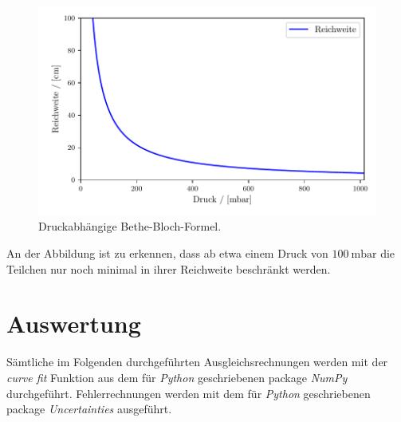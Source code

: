 \begin{figure}[H]
  \centering
  \includegraphics{build/Druck.pdf}
  \caption{Druckabhängige Bethe-Bloch-Formel.}
  \label{fig:Druck1}
\end{figure}

An der Abbildung ist zu erkennen, dass ab etwa einem Druck von $\SI{100}{\milli\bar}$ die Teilchen nur noch minimal in ihrer Reichweite beschränkt werden.
\newpage
\section{Auswertung}
\label{sec:Auswertung}
Sämtliche im Folgenden durchgeführten Ausgleichsrechnungen werden mit der \emph{curve fit} Funktion aus dem für \emph{Python} geschriebenen package \emph{NumPy}\cite{scipy} durchgeführt. Fehlerrechnungen werden mit dem für \emph{Python} geschriebenen package \emph{Uncertainties}\cite{uncertainties} ausgeführt.

